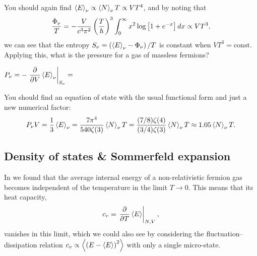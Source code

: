 You should again find $\left\langle E \right\rangle_{\nu} \propto \left\langle N \right\rangle_{\nu} T \propto VT^4$, and by noting that
\begin{equation*}
  \frac{\Phi_{\nu}}{T} = -\frac{V}{c^3 \pi^2} \left(\frac{T}{\hbar}\right)^3 \int_0^{\infty} x^2 \log\left[1 + e^{-x}\right] \mathop{dx} \propto VT^3,
\end{equation*}
we can see that the entropy $S_{\nu} = \left(\left\langle E \right\rangle_{\nu} - \Phi_{\nu}\right) / T$ is constant when $V T^3 = \mbox{const}$.
Applying this, what is the pressure for a gas of massless fermions?
\begin{mdframed}
  $\displaystyle P_{\nu} = -\left. \frac{\partial }{\partial V} \left\langle E \right\rangle_{\nu} \right|_{S_{\nu}} = $ \\[100 pt]
\end{mdframed}
You should find an equation of state with the usual functional form and just a new numerical factor:
\begin{equation*}
  P_{\nu} V = \frac{1}{3} \left\langle E \right\rangle_{\nu} = \frac{7\pi^4}{540\zeta(3)} \left\langle N \right\rangle_{\nu} T = \frac{(7/8)\zeta(4)}{(3/4)\zeta(3)} \left\langle N \right\rangle_{\nu} T \approx 1.05 \left\langle N \right\rangle_{\nu} T.
\end{equation*}



\newpage %
\subsection{\label{sec:Sommerfeld}Density of states \& Sommerfeld expansion}
In  we found that the average internal energy of a non-relativistic fermion gas becomes independent of the temperature in the limit $T \to 0$.
This means that its heat capacity,
\begin{equation*}
  c_v = \left. \frac{\partial }{\partial T} \left\langle E \right\rangle \right|_{N,V},
\end{equation*}
vanishes in this limit, which we could also see by considering the fluctuation--dissipation relation $c_v \propto \left\langle \left(E - \left\langle E \right\rangle\right)^2 \right\rangle$ with only a single micro-state. %

